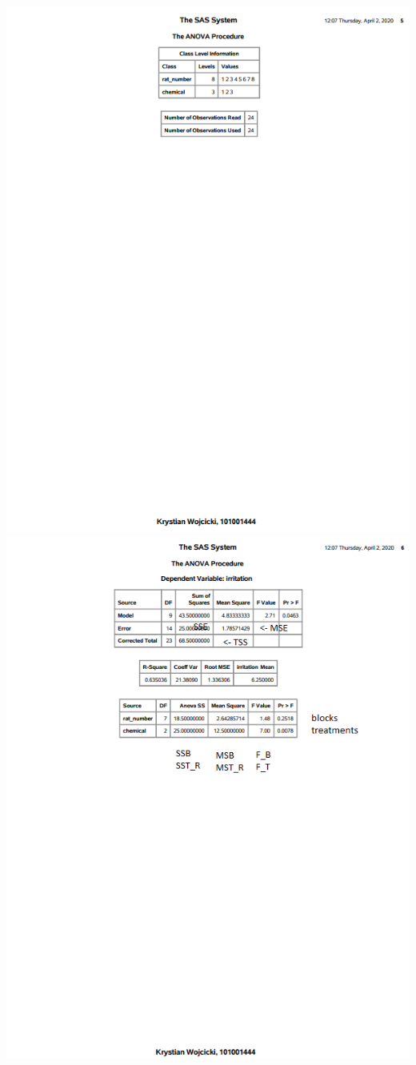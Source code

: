 \documentclass{article}
\begin{document}
\begin{center}
\includegraphics[scale=1]{a4_sas5}
\includegraphics[scale=1]{a4_sas6}\\

\end{center}
\end{document}
